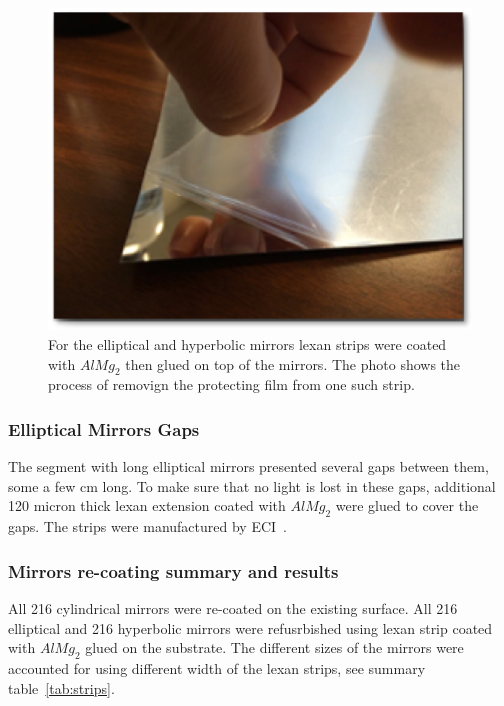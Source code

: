 \begin{figure}[h]
\centering
	\includegraphics[width=0.98\columnwidth,keepaspectratio]{img/filmOnStrip.png}
	\caption{For the elliptical and hyperbolic mirrors lexan strips were coated with $AlMg_2$ then glued on top of the mirrors. The photo shows
            the process of removign the protecting film from one such strip.}
	\label{fig:filmOnStrip}
\end{figure}


\subsubsection{Elliptical Mirrors Gaps}

The segment with long elliptical mirrors presented several gaps between them, some a few cm long. To make sure that no light is lost in these gaps,
additional 120 micron thick lexan extension coated with $AlMg_2$ were glued to cover the gaps. The strips were manufactured by ECI~\cite{ECI}.



\subsubsection{Mirrors re-coating summary and results}

All 216 cylindrical mirrors were re-coated on the existing surface. All 216 elliptical and 216 hyperbolic mirrors were refusrbished using lexan strip
coated with $AlMg_2$ glued on the substrate. The different sizes of the mirrors were accounted for using different width of the lexan strips, see
summary table~\ref{tab:strips}.


